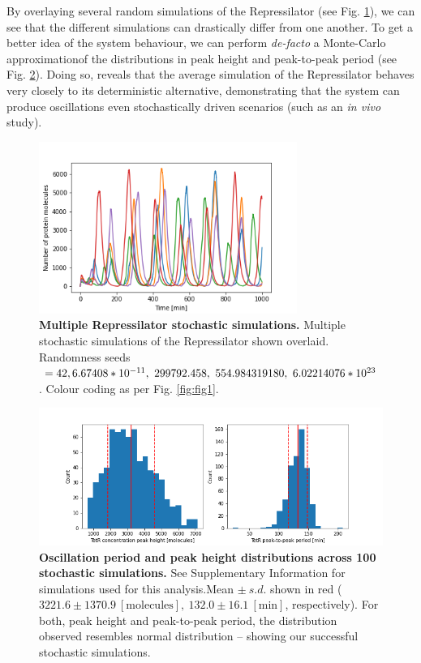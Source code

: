 \documentclass[runningheads,a4paper]{llncs}
\begin{document}
By overlaying several random simulations of the Repressilator (see Fig. \ref{fig:fig18}), we can see that  the different simulations can drastically differ from one another. To get a better idea of the system behaviour, we can perform \textit{de-facto} a Monte-Carlo approximation\linebreak of the distributions in peak height and peak-to-peak period (see Fig. \ref{fig:fig19}). Doing so, reveals that the average simulation of the Repressilator behaves very closely to its deterministic alternative, demonstrating that the system can produce oscillations even stochastically driven scenarios (such as an \textit{in vivo} study).

\begin{figure}
    \singlespacing
    \centering
    \includegraphics[width=0.75\textwidth]{suplementary_information_and_code/Task6_figure2.png}
    \caption{\textbf{Multiple Repressilator stochastic simulations.} Multiple stochastic simulations of the Repressilator shown overlaid. Randomness seeds $= 42,\linebreak 6.67408*10^{-11},\ 299792.458,\ 554.984319180,\ 6.02214076*10^{23}$. Colour coding as per Fig. \ref{fig:fig1}.}
    \label{fig:fig18}
\end{figure}

\begin{figure}
    \singlespacing
    \centering
    \includegraphics[width=1\textwidth,trim={1.5cm 0 1.5cm 0},clip]{suplementary_information_and_code/Task6_figure3.png}
    \caption{\textbf{Oscillation period and peak height distributions across 100 stochastic simulations.} See Supplementary Information for simulations used for this analysis.\linebreak Mean $\pm\ s.d.$ shown in red ($3221.6 \pm 1370.9\ [\textrm{molecules}],\ 132.0 \pm 16.1\ [\textrm{min}]$, respectively). For both, peak height and peak-to-peak period, the distribution observed resembles normal distribution -- showing our successful stochastic simulations.}
    \label{fig:fig19}
\end{figure}
\end{document}
